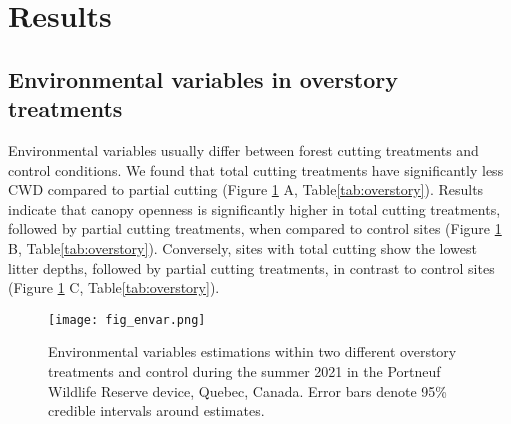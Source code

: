 \clearpage



\section*{Results}
\label{sec:results1}

\subsection*{Environmental variables in overstory treatments}
\label{subsec:ResEnv}

Environmental variables usually differ between forest cutting treatments and control conditions. We found that total cutting treatments have significantly less CWD compared to partial cutting (Figure \ref{fig:envar} A, Table\ref{tab:overstory}). 
Results indicate that canopy openness is significantly higher in total cutting treatments, followed by partial cutting treatments, when compared to control sites (Figure \ref{fig:envar} B, Table\ref{tab:overstory}). 
Conversely, sites with total cutting show the lowest litter depths, followed by partial cutting treatments, in contrast to control sites (Figure \ref{fig:envar} C, Table\ref{tab:overstory}).

\begin{figure}[ht]
  \centering
  \texttt{[image: fig\_envar.png]}
  \caption[Overstory treatments effects on environmental variables]{ Environmental variables estimations within two different overstory treatments and control during the summer 2021 in the Portneuf Wildlife Reserve device, Quebec, Canada. 
  Error bars denote 95\% credible intervals around estimates.}
  \label{fig:envar}
\end{figure}


